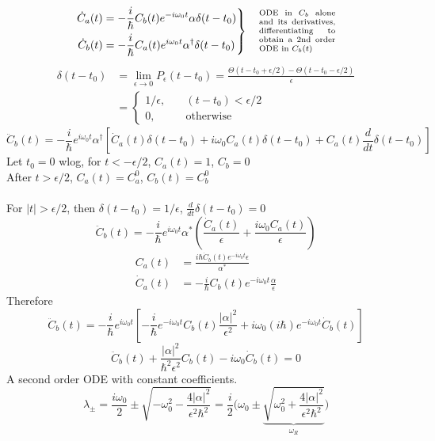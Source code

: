 \documentclass[12pt,fancychapters]{report}
\numberwithin{equation}{section}
\begin{document}
\begin{equation*}
 \left.\begin{aligned}
     \dot{C}_a (t) &= -\frac{i}{\hbar}C_b(t)e^{-i\omega_0t}\alpha \delta(t-t_0)\\
     \dot{C}_b (t) &= -\frac{i}{\hbar}C_a(t)e^{i\omega_0t}\alpha^{\dagger}\delta(t-t_0)
       \end{aligned}
 \right\}
 \quad \scriptsize \parbox{0.2\textwidth}{ODE in $C_b$ alone and its derivatives, differentiating
 to obtain a 2nd order ODE in $C_b(t)$}
\end{equation*}
\begin{align*}
  \delta(t-t_0) &= \lim_{\epsilon\to 0} P_\epsilon (t-t_0) = \frac{\Theta(t-t_0+\epsilon/2)
  -\Theta(t-t_0-\epsilon/2)}{\epsilon}\\
                &= \begin{cases}
                  1/\epsilon,&\quad (t-t_0)<\epsilon/2\\
                  0,&\quad \text{otherwise}
                \end{cases}
\end{align*}
\[
  \ddot{C}_b(t)=-\frac{i}{\hbar}e^{i\omega_0 t}\alpha^\dagger \left[
  \dot{C}_a(t)\delta(t-t_0)+ i\omega_0 C_a(t)\delta(t-t_0) + C_a(t)\frac{d}{dt}\delta
(t-t_0)\right]
\]
Let $t_0=0$ wlog, for $t<-\epsilon/2$, $C_a(t) = 1$, $C_b = 0$\\ 
After $t>\epsilon/2$, $C_a(t) = C_a^0$, $C_b(t) = C_b^0$\\
\\
For $\big|t\big|>\epsilon/2$, then $\delta(t-t_0) = 1/\epsilon$, $\frac{d}{dt}\delta(t-t_0) = 0$
\[
  \ddot{C}_b(t) = -\frac{i}{\hbar}e^{i\omega_0 t} \alpha^*\left(\frac{\dot{C}_a(t)}{\epsilon}
  + \frac{i\omega_0 C_a(t)}{\epsilon} \right) 
\]
\begin{align*}
  C_a(t) &= \frac{i\hbar \dot{C}_b(t)e^{-i\omega_0 t}\epsilon}{\alpha^*}\\
  \dot{C}_a(t) &= -\frac{i}{\hbar}C_b(t)e^{-i\omega_0 t}\frac{\alpha}{\epsilon} 
\end{align*}
Therefore 
\[
  \ddot{C}_b (t) = -\frac{i}{\hbar}e^{i\omega_0 t}\left[-\frac{i}{\hbar}e^{-i\omega_0 t}
  C_b(t) \frac{\big|\alpha\big|^2}{\epsilon^2}+ i\omega_0 (i\hbar)e^{-i\omega_0 t}
\dot{C}_b(t)\right]
\]
\[
  \ddot{C}_b(t) + \frac{\big|\alpha\big|^2}{\hbar^2\epsilon^2}C_b(t)-i\omega_0\dot{C}_b(t) = 0
\]
A second order ODE  with constant coefficients.
\[
  \lambda_\pm = \frac{i\omega_0}{2}\pm\sqrt{-\omega_0^2 - \frac{4\big|\alpha\big|^2}{\epsilon^2
  \hbar^2}} = \frac{i}{2}\Bigg(\omega_0 \pm \underbrace{\sqrt{\omega_0^2 +\frac{4\big|\alpha\big|^2}
  {\epsilon^2\hbar^2}}}_{\omega_R}\Bigg)
\]
\end{document}
